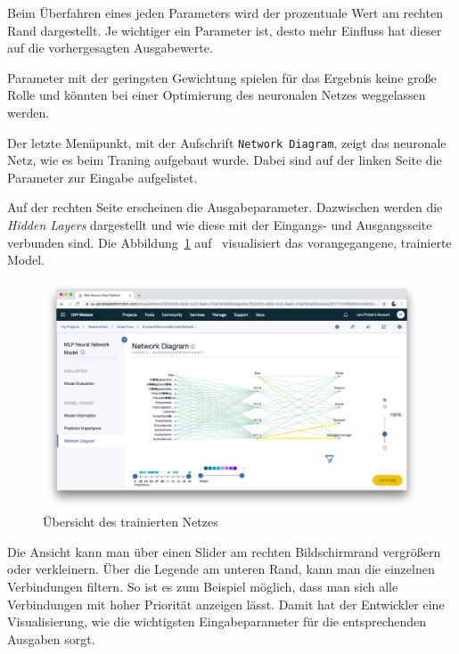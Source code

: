 Beim Überfahren eines jeden Parameters wird der prozentuale Wert am rechten Rand dargestellt. Je wichtiger ein Parameter
ist, desto mehr Einfluss hat dieser auf die vorhergesagten Ausgabewerte.

Parameter mit der geringsten Gewichtung spielen für das Ergebnis keine große Rolle und könnten bei einer Optimierung des
neuronalen Netzes weggelassen werden.

Der letzte Menüpunkt, mit der Aufschrift \texttt{Network Diagram}, zeigt das neuronale Netz, wie es beim Traning aufgebaut
wurde. Dabei sind auf der linken Seite die Parameter zur Eingabe aufgelistet.

Auf der rechten Seite erscheinen die Ausgabeparameter. Dazwischen werden die \textit{Hidden Layers} dargestellt und wie
diese mit der Eingangs- und Ausgangsseite verbunden sind. Die Abbildung~\ref{fig:umsetzung_model_network_diagram}
auf~\pageref{fig:umsetzung_model_network_diagram} visualisiert das vorangegangene, trainierte Model.

\begin{figure}[h]
    \centering
    \includegraphics[width=\textwidth]{images/kapitel_3/model_network_diagram.png}
    \caption{Übersicht des trainierten Netzes}
    \label{fig:umsetzung_model_network_diagram}
\end{figure}

Die Ansicht kann man über einen Slider am rechten Bildschirmrand vergrößern oder verkleinern. Über die Legende am
unteren Rand, kann man die einzelnen Verbindungen filtern. So ist es zum Beispiel möglich, dass man sich alle
Verbindungen mit hoher Priorität anzeigen lässt. Damit hat der Entwickler eine Visualisierung, wie die wichtigsten
Eingabeparameter für die entsprechenden Ausgaben sorgt.

